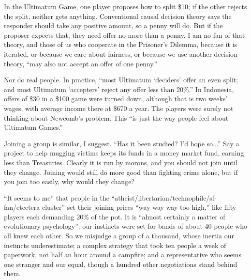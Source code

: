
In the Ultimatum Game, one player proposes how to split \$10; if the other rejects the split, neither gets anything. Conventional causal decision theory says the responder should take any positive amount, so a penny will do. But if the proposer expects that, they need offer no more than a penny. I am no fan of that theory, and those of us who cooperate in the Prisoner's Dilemma, because it is iterated, or because we care about fairness, or because we use another decision theory, ``may also not accept an offer of one penny.''

Nor do real people. In practice, ``most Ultimatum `deciders' offer an even split; and most Ultimatum `accepters' reject any offer less than 20\%.'' In Indonesia, offers of \$30 in a \$100 game were turned down, although that is two weeks' wages, with average income there at \$670 a year. The players were surely not thinking about Newcomb's problem.  This ``is just the way people feel about Ultimatum Games.'' 

Joining a group is similar, I suggest. ``Has it been studied? I'd hope so...''  Say a project to help mugging victims keeps its funds in a money market fund, earning less than Treasuries. Clearly it is run by morons, and you should not join until they change. Joining would still do more good than fighting crime alone, but if you join too easily, why would they change?

``It seems to me'' that people in the ``atheist\slash{}libertarian\slash{}technophile/sf-fan/etcetera cluster'' set their joining prices ``way way way too high,'' like fifty players each demanding 20\% of the pot. It is ``almost certainly a matter of evolutionary psychology'': our instincts were set for bands of about 40 people who all knew each other.  So we misjudge a group of a thousand, whose inertia our instincts underestimate; a complex strategy that took ten people a week of paperwork, not half an hour around a campfire; and a representative who seems one stranger and our equal, though a hundred other negotiations stand behind them.

